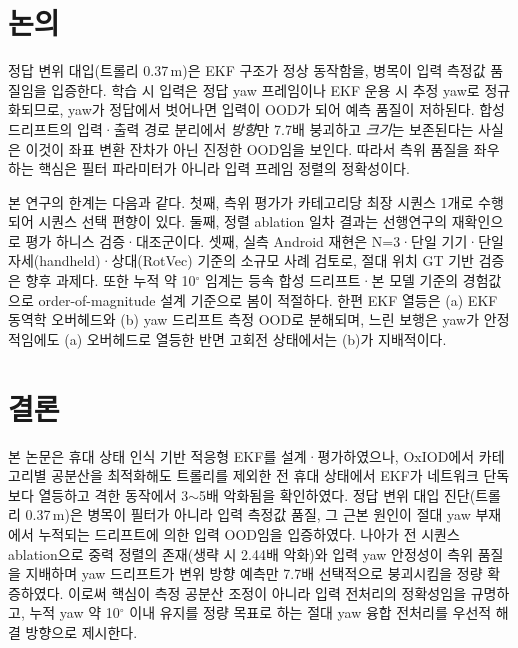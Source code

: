 \documentclass[10pt,twocolumn,a4paper]{article}
\begin{document}
\section{논의}
정답 변위 대입(트롤리 0.37\,m)은 EKF 구조가 정상 동작함을, 병목이 입력 측정값 품질임을 입증한다. 학습 시 입력은 정답 yaw 프레임이나 EKF 운용 시 추정 yaw로 정규화되므로, yaw가 정답에서 벗어나면 입력이 OOD가 되어 예측 품질이 저하된다. 합성 드리프트의 입력·출력 경로 분리에서 \emph{방향}만 7.7배 붕괴하고 \emph{크기}는 보존된다는 사실은 이것이 좌표 변환 잔차가 아닌 진정한 OOD임을 보인다. 따라서 측위 품질을 좌우하는 핵심은 필터 파라미터가 아니라 입력 프레임 정렬의 정확성이다.

본 연구의 한계는 다음과 같다. 첫째, 측위 평가가 카테고리당 최장 시퀀스 1개로 수행되어 시퀀스 선택 편향이 있다. 둘째, 정렬 ablation 일차 결과는 선행연구의 재확인으로 평가 하니스 검증·대조군이다. 셋째, 실측 Android 재현은 N=3·단일 기기·단일 자세(handheld)·상대(RotVec) 기준의 소규모 사례 검토로, 절대 위치 GT 기반 검증은 향후 과제다. 또한 누적 약 10$^\circ$ 임계는 등속 합성 드리프트·본 모델 기준의 경험값으로 order-of-magnitude 설계 기준으로 봄이 적절하다. 한편 EKF 열등은 (a) EKF 동역학 오버헤드와 (b) yaw 드리프트 측정 OOD로 분해되며, 느린 보행은 yaw가 안정적임에도 (a) 오버헤드로 열등한 반면 고회전 상태에서는 (b)가 지배적이다.

\section{결론}
본 논문은 휴대 상태 인식 기반 적응형 EKF를 설계·평가하였으나, OxIOD에서 카테고리별 공분산을 최적화해도 트롤리를 제외한 전 휴대 상태에서 EKF가 네트워크 단독보다 열등하고 격한 동작에서 3$\sim$5배 악화됨을 확인하였다. 정답 변위 대입 진단(트롤리 0.37\,m)은 병목이 필터가 아니라 입력 측정값 품질, 그 근본 원인이 절대 yaw 부재에서 누적되는 드리프트에 의한 입력 OOD임을 입증하였다. 나아가 전 시퀀스 ablation으로 중력 정렬의 존재(생략 시 2.44배 악화)와 입력 yaw 안정성이 측위 품질을 지배하며 yaw 드리프트가 변위 방향 예측만 7.7배 선택적으로 붕괴시킴을 정량 확증하였다. 이로써 핵심이 측정 공분산 조정이 아니라 입력 전처리의 정확성임을 규명하고, 누적 yaw 약 10$^\circ$ 이내 유지를 정량 목표로 하는 절대 yaw 융합 전처리를 우선적 해결 방향으로 제시한다.



\end{document}

